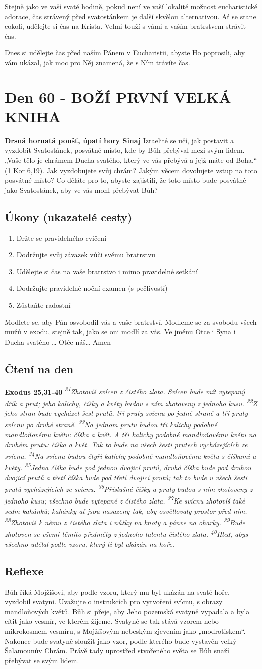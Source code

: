 \documentclass[11pt]{article}
\newcommand{\zacatekDevatyTyden}{
\textbf{Drsná hornatá poušť, úpatí hory Sinaj} \newline 
Izraelité se učí, jak postavit a vyzdobit Svatostánek, posvátné místo, kde by Bůh přebýval mezi svým lidem. „Vaše tělo je chrámem Ducha svatého, který ve vás přebývá a jejž máte od Boha,“ (1 Kor 6,19). Jak vyzdobujete svůj chrám? Jakým věcem dovolujete vstup na toto posvátné místo? Co děláte pro to, abyste zajistili, že toto místo bude posvátné jako Svatostánek, aby ve vás mohl přebývat Bůh?

\subsection*{Úkony (ukazatelé cesty)}
\begin{enumerate}
  \item Držte se pravidelného cvičení
  \item Dodržujte svůj závazek vůči svému bratrstvu
  \item Udělejte si čas na vaše bratrstvo i mimo pravidelné setkání
  \item Dodržujte pravidelné noční examen (s pečlivostí)
  \item Zůstaňte radostní
\end{enumerate}
Modlete se, aby Pán osvobodil vás a vaše bratrství. \newline
Modleme se za svobodu všech mužů v exodu, stejně tak, jako se oni modlí za vás.\newline
Ve jménu Otce i Syna i Ducha svatého …  Otče náš… Amen
}
\begin{document}
Stejně jako ve vaší svaté hodině, pokud není ve vaší lokalitě možnost eucharistické adorace, čas strávený před svatostánkem je
další skvělou alternativou. Ať se stane cokoli, udělejte si čas na Krista. Velmi touží s vámi a vaším bratrstvem strávit čas.

Dnes si udělejte čas před naším Pánem v Eucharistii, abyste Ho poprosili, aby vám ukázal, jak moc pro Něj znamená, že s Ním
trávíte čas.


\newpage
\section{Den 60 - BOŽÍ PRVNÍ VELKÁ KNIHA}
\zacatekDevatyTyden
\subsection*{Čtení na den}
\textbf{Exodus 25,31-40}
\newline
\textit{
\textsuperscript{31}Zhotovíš svícen z čistého zlata. Svícen bude mít vytepaný dřík a prut; jeho kalichy, číšky a květy budou s ním zhotoveny z jednoho kusu.
\textsuperscript{32}Z jeho stran bude vycházet šest prutů, tři pruty svícnu po jedné straně a tři pruty svícnu po druhé straně.
\textsuperscript{33}Na jednom prutu budou tři kalichy podobné mandloňovému květu: číška a květ. A tři kalichy podobné mandloňovému květu na druhém prutu: číška a květ. Tak to bude na všech šesti prutech vycházejících ze svícnu.
\textsuperscript{34}Na svícnu budou čtyři kalichy podobné mandloňovému květu s číškami a květy.
\textsuperscript{35}Jedna číška bude pod jednou dvojicí prutů, druhá číška bude pod druhou dvojicí prutů a třetí číška bude pod třetí dvojicí prutů; tak to bude u všech šesti prutů vycházejících ze svícnu.
\textsuperscript{36}Příslušné číšky a pruty budou s ním zhotoveny z jednoho kusu; všechno bude vytepané z čistého zlata.
\textsuperscript{37}Ke svícnu zhotovíš také sedm kahánků; kahánky ať jsou nasazeny tak, aby osvětlovaly prostor před ním.
\textsuperscript{38}Zhotovíš k němu z čistého zlata i nůžky na knoty a pánve na oharky.
\textsuperscript{39}Bude zhotoven se všemi těmito předměty z jednoho talentu čistého zlata.
\textsuperscript{40}Hleď, abys všechno udělal podle vzoru, který ti byl ukázán na hoře.
}

\subsection*{Reflexe}
Bůh říká Mojžíšovi, aby podle vzoru, který mu byl ukázán na svaté hoře, vyzdobil svatyni. Uvažujte o instrukcích pro
vytvoření svícnu, s obrazy mandloňových květů. Bůh si přeje, aby Jeho pozemská svatyně vypadala a byla cítit jako
vesmír, ve kterém žijeme. Svatyně se tak stává vzorem nebo mikrokosmem vesmíru, s Mojžíšovým nebeským
zjevením jako „modrotiskem“. Nakonec bude svatyně sloužit jako vzor, podle kterého bude vystavěn velký
Šalamounův Chrám. Právě tady uprostřed stvořeného světa se Bůh snaží přebývat se svým lidem.
\end{document}
